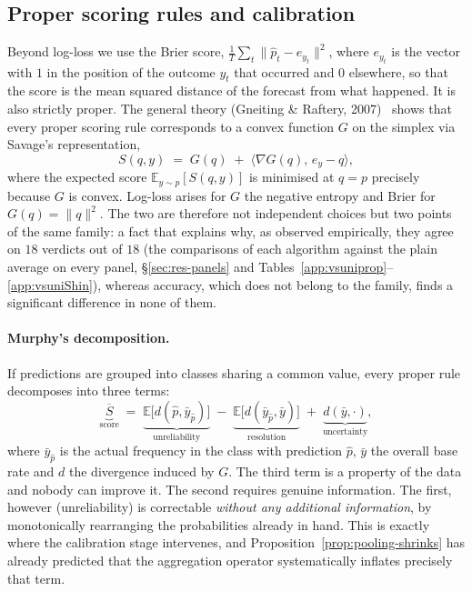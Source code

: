 \documentclass[12pt,a4paper,oneside]{report}
\renewcommand{\_}{\oldunderscore\allowbreak}
\theoremstyle{definition}
\theoremstyle{plain}
\theoremstyle{definition}   %
\begin{document}
\subsection{Proper scoring rules and calibration}
\label{sec:calib-theory}

Beyond log-loss we use the Brier score, $\frac{1}{T}\sum_t \|\hat{p}_t - e_{y_t}\|^2$, where
$e_{y_t}$ is the vector with $1$ in the position of the outcome $y_t$ that occurred and $0$
elsewhere, so that the score is the mean squared distance of the forecast from what happened.
It is also strictly proper. The general theory (Gneiting \& Raftery, 2007)~\cite{gneiting2007} shows that every proper scoring
rule corresponds to a convex function $G$ on the simplex via Savage's representation,
\[
S(q,y) \;=\; G(q) \;+\; \langle \nabla G(q),\, e_y - q\rangle,
\]
where the expected score $\mathbb{E}_{y\sim p}[S(q,y)]$ is minimised at $q=p$ precisely because
$G$ is convex. Log-loss arises for $G$ the negative entropy and Brier for $G(q)=\|q\|^2$. The two
are therefore not independent choices but two points of the same family: a fact that explains
why, as observed empirically, they agree on $18$ verdicts out of $18$ (the comparisons of each
algorithm against the plain average on every panel, \S\ref{sec:res-panels} and
Tables~\ref{app:vsuniprop}--\ref{app:vsuniShin}), whereas accuracy, which
does not belong to the family, finds a significant difference in none of them.

\paragraph{Murphy's decomposition.} If predictions are grouped into classes sharing a common
value, every proper rule decomposes into three terms:
\[
\underbrace{\overline{S}}_{\text{score}} \;=\;
\underbrace{\mathbb{E}\big[ d(\hat{p}, \bar{y}_{\hat{p}}) \big]}_{\text{unreliability}}
\;-\; \underbrace{\mathbb{E}\big[ d(\bar{y}_{\hat{p}}, \bar{y}) \big]}_{\text{resolution}}
\;+\; \underbrace{d(\bar{y}, \cdot)}_{\text{uncertainty}},
\]
where $\bar{y}_{\hat{p}}$ is the actual frequency in the class with prediction $\hat{p}$,
$\bar{y}$ the overall base rate and $d$ the divergence induced by $G$. The third term is a
property of the data and nobody can improve it. The second requires genuine information. The
first, however (unreliability) is correctable \emph{without any additional information}, by
monotonically rearranging the probabilities already in hand. This is exactly where the
calibration stage intervenes, and Proposition~\ref{prop:pooling-shrinks} has already predicted
that the aggregation operator systematically inflates precisely that term.
\end{document}

